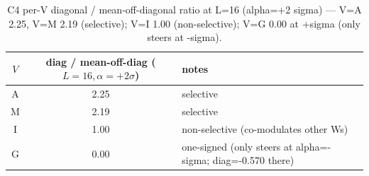 \begin{table}[t]
\centering
\caption{C4 per-V diagonal / mean-off-diagonal ratio at L=16 (alpha=+2 sigma) — V=A 2.25, V=M 2.19 (selective); V=I 1.00 (non-selective); V=G 0.00 at +sigma (only steers at -sigma).}
\label{tab:c4_perV_selectivity_ratio}
\begin{tabular}{ccl}
\toprule
$V$ & diag / mean-off-diag ($L=16, \alpha=+2\sigma$) & notes \\
\midrule
A & 2.25 & selective \\
M & 2.19 & selective \\
I & 1.00 & non-selective (co-modulates other Ws) \\
G & 0.00 & one-signed (only steers at alpha=-sigma; diag=-0.570 there) \\
\bottomrule
\end{tabular}
\end{table}
